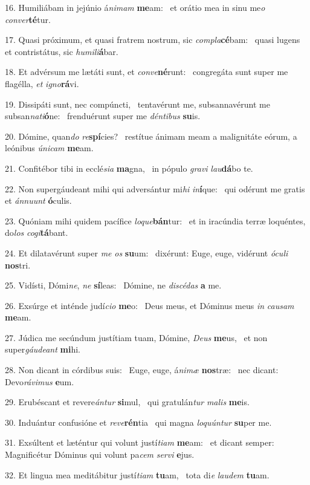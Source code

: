 16. Humiliábam in jejúnio á\textit{ni}\textit{mam} \textbf{me}am: \ast\  et orátio mea in sinu me\textit{o} \textit{con}\textit{ver}\textbf{té}tur.\

17. Quasi próximum, et quasi fratrem nostrum, sic \textit{com}\textit{pla}\textbf{cé}bam: \ast\  quasi lugens et contristátus, sic \textit{hu}\textit{mi}\textit{li}\textbf{á}bar.\

18. Et advérsum me lætáti sunt, et \textit{con}\textit{ve}\textbf{né}runt: \ast\  congregáta sunt super me flagélla, \textit{et} \textit{i}\textit{gno}\textbf{rá}vi.\

19. Dissipáti sunt, nec compúncti, \dag\  tentavérunt me, subsannavérunt me subsan\textit{na}\textit{ti}\textbf{ó}ne: \ast\  frenduérunt super me \textit{dén}\textit{ti}\textit{bus} \textbf{su}is.\

20. Dómine, quan\textit{do} \textit{re}\textbf{spí}cies? \ast\  restítue ánimam meam a malignitáte eórum, a leónibus \textit{ú}\textit{ni}\textit{cam} \textbf{me}am.\

21. Confitébor tibi in ecclé\textit{si}\textit{a} \textbf{ma}gna, \ast\  in pópulo \textit{gra}\textit{vi} \textit{lau}\textbf{dá}bo te.\

22. Non supergáudeant mihi qui adversántur mi\textit{hi} \textit{in}\textbf{í}que: \ast\  qui odérunt me gratis et \textit{án}\textit{nu}\textit{unt} \textbf{ó}culis.\

23. Quóniam mihi quidem pacífice \textit{lo}\textit{que}\textbf{bán}tur: \ast\  et in iracúndia terræ loquéntes, do\textit{los} \textit{co}\textit{gi}\textbf{tá}bant.\

24. Et dilatavérunt super \textit{me} \textit{os} \textbf{su}um: \ast\  dixérunt: Euge, euge, vidérunt \textit{ó}\textit{cu}\textit{li} \textbf{nos}tri.\

25. Vidísti, Dómi\textit{ne}, \textit{ne} \textbf{sí}leas: \ast\  Dómine, ne \textit{di}\textit{scé}\textit{das} \textbf{a} me.\

26. Exsúrge et inténde judí\textit{ci}\textit{o} \textbf{me}o: \ast\  Deus meus, et Dóminus meus \textit{in} \textit{cau}\textit{sam} \textbf{me}am.\

27. Júdica me secúndum justítiam tuam, Dómine, \textit{De}\textit{us} \textbf{me}us, \ast\  et non super\textit{gáu}\textit{de}\textit{ant} \textbf{mi}hi.\

28. Non dicant in córdibus suis: \dag\  Euge, euge, á\textit{ni}\textit{mæ} \textbf{nos}træ: \ast\  nec dicant: Devo\textit{rá}\textit{vi}\textit{mus} \textbf{e}um.\

29. Erubéscant et revere\textit{án}\textit{tur} \textbf{si}mul, \ast\  qui gratulán\textit{tur} \textit{ma}\textit{lis} \textbf{me}is.\

30. Induántur confusióne et \textit{re}\textit{ve}\textbf{rén}tia \ast\  qui magna \textit{lo}\textit{quún}\textit{tur} \textbf{su}per me.\

31. Exsúltent et læténtur qui volunt justí\textit{ti}\textit{am} \textbf{me}am: \ast\  et dicant semper: Magnificétur Dóminus qui volunt pa\textit{cem} \textit{ser}\textit{vi} \textbf{e}jus.\

32. Et lingua mea meditábitur justí\textit{ti}\textit{am} \textbf{tu}am, \ast\  tota di\textit{e} \textit{lau}\textit{dem} \textbf{tu}am.\

